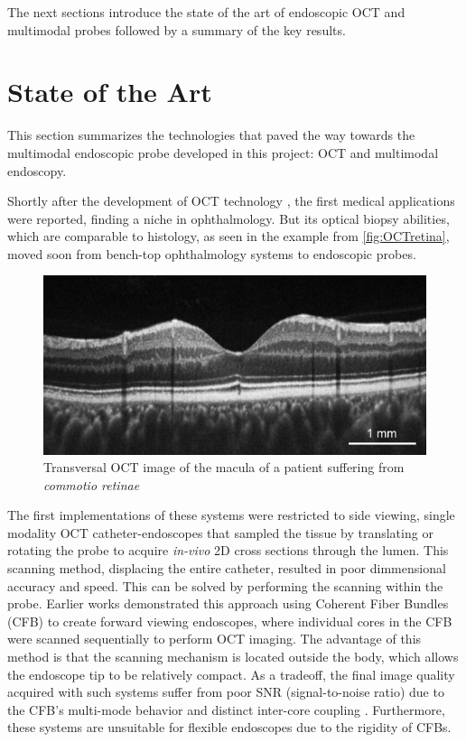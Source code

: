 The next sections introduce the state of the art of endoscopic OCT and multimodal probes followed by a summary of the key results.

\section{State of the Art}
This section summarizes the technologies that paved the way towards the multimodal endoscopic probe developed in this project: OCT and multimodal endoscopy.

Shortly after the development of OCT technology \cite{Huang1991}, the first medical applications were reported, finding a niche in ophthalmology. But its optical biopsy abilities, which are comparable to histology, as seen in the example from \autoref{fig:OCTretina}, moved soon from bench-top ophthalmology systems to endoscopic probes.  
\begin{figure}[h!]\centering
      \includegraphics{figures/10_Introduction/oct.pdf}
      \caption{Transversal OCT image of the macula of a patient suffering from \textit{commotio retinae}\cite{Flatter2013}}
      \label{fig:OCTretina}
\end{figure}
The first implementations of these systems were restricted to side viewing, single modality OCT catheter-endoscopes that sampled the tissue by translating \cite{Feldchtein1998} or rotating \cite{Tearney1994} \cite{Tearney1996} the probe to acquire \textit{in-vivo} 2D cross sections through the lumen. This scanning method, displacing the entire catheter, resulted in poor dimmensional accuracy and speed. This can be solved by performing the scanning within the probe. Earlier works demonstrated this approach using Coherent Fiber Bundles (CFB) to create forward viewing endoscopes, where individual cores in the CFB were scanned sequentially to perform OCT imaging. The advantage of this method is that the scanning mechanism is located outside the body, which allows the endoscope tip to be relatively compact. As a tradeoff, the final image quality acquired with such systems suffer from poor SNR (signal-to-noise ratio) due to the CFB’s multi-mode behavior and distinct inter-core coupling \cite{Xie2005}. Furthermore, these systems are unsuitable for flexible endoscopes due to the rigidity of CFBs.

